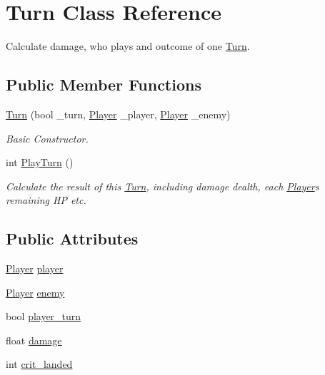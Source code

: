 \hypertarget{class_turn}{}\section{Turn Class Reference}
\label{class_turn}


Calculate damage, who plays and outcome of one \mbox{\hyperlink{class_turn}{Turn}}.  


\subsection*{Public Member Functions}
\begin{DoxyCompactItemize}
\item 
\mbox{\hyperlink{class_turn_a573bc57fc636b4699b476aed4c1278ba}{Turn}} (bool \+\_\+turn, \mbox{\hyperlink{class_player}{Player}} \+\_\+player, \mbox{\hyperlink{class_player}{Player}} \+\_\+enemy)
\begin{DoxyCompactList}\small\item\em Basic Constructor. \end{DoxyCompactList}\item 
int \mbox{\hyperlink{class_turn_abc3ccf0218afc2904a2dbd37561a56b2}{Play\+Turn}} ()
\begin{DoxyCompactList}\small\item\em Calculate the result of this \mbox{\hyperlink{class_turn}{Turn}}, including damage dealth, each \mbox{\hyperlink{class_player}{Player}}\textquotesingle{}s remaining HP etc. \end{DoxyCompactList}\end{DoxyCompactItemize}
\subsection*{Public Attributes}
\begin{DoxyCompactItemize}
\item 
\mbox{\hyperlink{class_player}{Player}} \mbox{\hyperlink{class_turn_abcef0253137bf6c75965b66e5f7a4d5e}{player}}
\item 
\mbox{\hyperlink{class_player}{Player}} \mbox{\hyperlink{class_turn_a4ceac3369c1d8eb19b2ad8ac4925b9a7}{enemy}}
\item 
bool \mbox{\hyperlink{class_turn_ae3877d2983475bd0123819bfb1ad3fa9}{player\+\_\+turn}}
\item 
float \mbox{\hyperlink{class_turn_a1bd13f96a59a1f958d2e8c98657d860d}{damage}}
\item 
int \mbox{\hyperlink{class_turn_adee435c5c71d7bfe0c701e11dea8c365}{crit\+\_\+landed}}
\end{DoxyCompactItemize}
